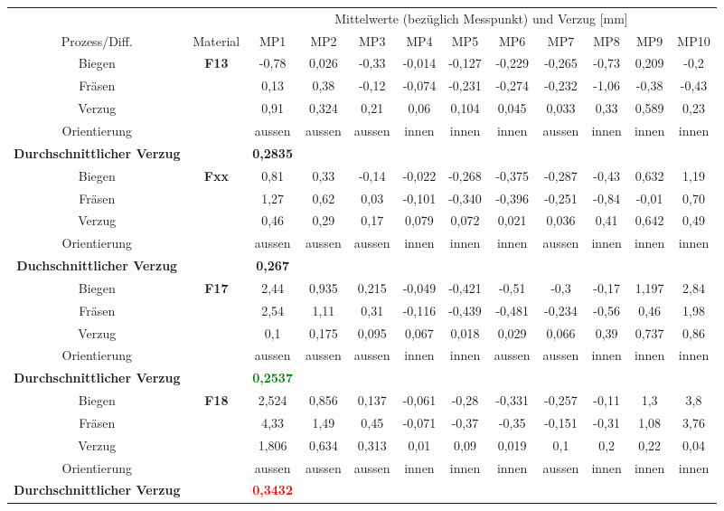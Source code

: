 \documentclass[12pt,a4paper,parskip,twoside,BCOR5mm,headsepline]{scrartcl}
\begin{document}
\begin{table}
\begin{tabular}{cccccccccccc}
\toprule
&& \multicolumn{10}{c}{Mittelwerte (bezüglich Messpunkt) und Verzug [\si{\milli\meter}]} \\
\cmidrule(2){3-12}
Prozess/Diff. & Material & MP1 & MP2 & MP3 & MP4 & MP5 & MP6 & MP7 & MP8 & MP9 & MP10 \\
\midrule
Biegen & \textbf{F13} & -0,78 & 0,026 & -0,33 & -0,014 & -0,127 & -0,229 & -0,265 & -0,73 & 0,209 & -0,2 \\
Fräsen && 0,13 & 0,38 & -0,12 & -0,074 & -0,231 & -0,274 & -0,232 & -1,06 & -0,38 & -0,43 \\
Verzug && 0,91 & 0,324 & 0,21 & 0,06 & 0,104 & 0,045 & 0,033 & 0,33 & 0,589 & 0,23 \\
Orientierung && aussen & aussen & aussen & innen & innen & innen & aussen & innen & innen & innen \\
\textbf{Durchschnittlicher Verzug} &&\textbf{0,2835}&&&&&&&&&\\
\midrule
Biegen & \textbf{Fxx} & 0,81 & 0,33 & -0,14 & -0,022 & -0,268 & -0,375 & -0,287 & -0,43 & 0,632 & 1,19\\
Fräsen && 1,27 & 0,62 & 0,03 & -0,101 & -0,340 & -0,396 & -0,251 & -0,84 & -0,01 & 0,70 \\
Verzug && 0,46 & 0,29 & 0,17 & 0,079 & 0,072 & 0,021 & 0,036 & 0,41 & 0,642 & 0,49 \\
Orientierung && aussen & aussen & aussen & innen & innen & innen & aussen & innen & innen & innen \\
\textbf{Duchschnittlicher Verzug} && \textbf{0,267}&&&&&&&&&\\
\midrule
Biegen & \textbf{F17} & 2,44 & 0,935 & 0,215 & -0,049 & -0,421 & -0,51 & -0,3 & -0,17 & 1,197 & 2,84 \\
Fräsen && 2,54 & 1,11 & 0,31 & -0,116 & -0,439  & -0,481  & -0,234  & -0,56 & 0,46 & 1,98  \\
Verzug && 0,1 & 0,175 & 0,095 & 0,067 & 0,018 & 0,029 &  0,066 & 0,39 & 0,737 & 0,86 \\
Orientierung && aussen & aussen & aussen & innen & innen & aussen & aussen & innen & innen & innen \\
\textbf{Durchschnittlicher Verzug} && \textbf{\textcolor{green}{0,2537}} &&&&&&&&&\\
\midrule
Biegen & \textbf{F18} & 2,524 & 0,856 & 0,137 & -0,061 & -0,28 & -0,331 & -0,257 & -0,11 & 1,3 & 3,8 \\
Fräsen && 4,33 & 1,49 & 0,45 & -0,071 & -0,37 & -0,35 & -0,151 & -0,31 & 1,08 & 3,76 \\
Verzug && 1,806 & 0,634 & 0,313 & 0,01 & 0,09 & 0,019 & 0,1 & 0,2 & 0,22 & 0,04 \\
Orientierung && aussen & aussen & aussen & innen & innen & innen & aussen & innen & innen & innen \\
\textbf{Durchschnittlicher Verzug} && \textbf{\textcolor{red}{0,3432}} &&&&&&&&&\\
\bottomrule
\end{tabular}
\end{table}
\newpage
\end{document}
